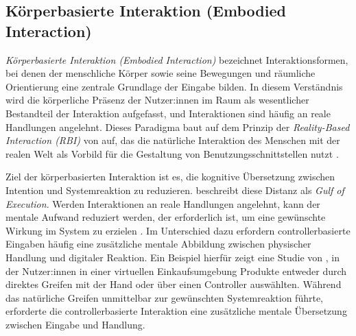 \subsection{Körper\-basierte Interaktion (Embodied Interaction)}
\label{sec:rw_embodied}

\textit{Körper\-basierte Interaktion (Embodied Interaction)} bezeichnet Interaktionsformen, bei denen der menschliche Körper sowie seine Bewegungen und räumliche Orientierung eine zentrale Grundlage der Eingabe bilden. In diesem Verständnis wird die körperliche Präsenz der Nutzer:innen im Raum als wesentlicher Bestandteil der Interaktion aufgefasst, und Interaktionen sind häufig an reale Handlungen angelehnt. Dieses Paradigma baut auf dem Prinzip der \textit{Reality-Based Interaction (RBI)} von \textcite{jacob2008realitybasedinteraction} auf, das die natürliche Interaktion des Menschen mit der realen Welt als Vorbild für die Gestaltung von Benutzungsschnittstellen nutzt \parencite{jacob2008realitybasedinteraction}.

Ziel der körper\-basierten Interaktion ist es, die kognitive Übersetzung zwischen Intention und Systemreaktion zu reduzieren. \textcite{norman1986CognitiveEngineering} beschreibt diese Distanz als \textit{Gulf of Execution}. Werden Interaktionen an reale Handlungen angelehnt, kann der mentale Aufwand reduziert werden, der erforderlich ist, um eine gewünschte Wirkung im System zu erzielen \parencite{norman1986CognitiveEngineering}. Im Unterschied dazu erfordern controllerbasierte Eingaben häufig eine zusätzliche mentale Abbildung zwischen physischer Handlung und digitaler Reaktion. Ein Beispiel hierfür zeigt eine Studie von \textcite{vona2025handsvscontrollerscomparing}, in der Nutzer:innen in einer virtuellen Einkaufsumgebung Produkte entweder durch direktes Greifen mit der Hand oder über einen Controller auswählten. Während das natürliche Greifen unmittelbar zur gewünschten Systemreaktion führte, erforderte die controllerbasierte Interaktion eine zusätzliche mentale Übersetzung zwischen Eingabe und Handlung.

